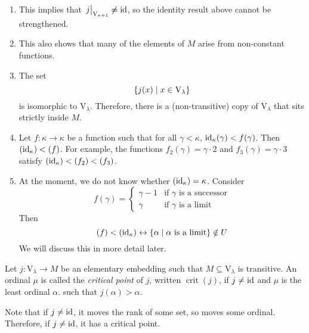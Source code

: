 \begin{remark}
    \begin{enumerate}
        \item This implies that \( \eval{j}_{\mathrm{V}_{\kappa + 1}} \neq \id \), so the identity result above cannot be strengthened.
        \item This also shows that many of the elements of \( M \) arise from non-constant functions.
        \item The set
        \[ \qty{j(x) \mid x \in \mathrm{V}_\lambda} \]
        is isomorphic to \( \mathrm{V}_\lambda \).
        Therefore, there is a (non-transitive) copy of \( \mathrm{V}_\lambda \) that sits strictly inside \( M \).
        \item Let \( f : \kappa \to \kappa \) be a function such that for all \( \gamma < \kappa \), \( \operatorname{id}_\kappa(\gamma) < f(\gamma) \).
        Then \( (\operatorname{id}_\kappa) < (f) \).
        For example, the functions \( f_2(\gamma) = \gamma \cdot 2 \) and \( f_3(\gamma) = \gamma \cdot 3 \) satisfy \( (\operatorname{id}_\kappa) < (f_2) < (f_3) \).
        \item At the moment, we do not know whether \( (\operatorname{id}_\kappa) = \kappa \).
        Consider
        \[ f(\gamma) = \begin{cases}
            \gamma - 1 & \text{if } \gamma \text{ is a successor} \\
            \gamma & \text{if } \gamma \text{ is a limit}
        \end{cases} \]
        Then
        \[ (f) < (\operatorname{id}_\kappa) \leftrightarrow \qty{\alpha \mid \alpha \text{ is a limit}} \notin U \]
        We will discuss this in more detail later.
    \end{enumerate}
\end{remark}
\begin{definition}
    Let \( j : \mathrm{V}_\lambda \to M \) be an elementary embedding such that \( M \subseteq \mathrm{V}_\lambda \) is transitive.
    An ordinal \( \mu \) is called the \emph{critical point} of \( j \), written \( \operatorname{crit}(j) \), if \( j \neq \operatorname{id} \) and \( \mu \) is the least ordinal \( \alpha \). such that \( j(\alpha) > \alpha \).
\end{definition}
Note that if \( j \neq \operatorname{id} \), it moves the rank of some set, so moves some ordinal.
Therefore, if \( j \neq \operatorname{id} \), it has a critical point.

